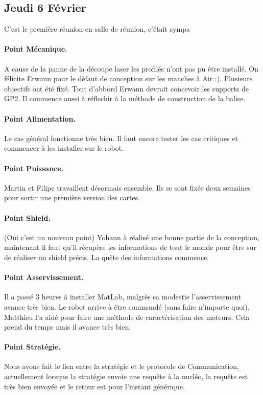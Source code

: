 \documentclass[a4paper,10pt]{report}
\begin{document}
\begin{spacing}{1.5}
\newpage
\section*{Jeudi 6 Février}
C'est le première réunion en salle de réunion, c'était sympa
\paragraph{Point Mécanique.}
A cause de la panne de la découpe laser les profilés n'ont pas pu être installé.
On félicite Erwann pour le défaut de conception sur les manches à Air :).
Plusieurs objectifs ont été fixé. Tout d'abbord Erwann devrait concevoir les
supports de GP2. Il commence aussi à réflechir à la méthode de construction de
la balise.
\paragraph{Point Alimentation.} Le cas général fonctionne très bien. Il faut
encore tester les cas critiques et commencer à les installer sur le robot.
\paragraph{Point Puissance.} Martin et Filipe travaillent désormais ensemble.
Ils se sont fixés deux semaines pour sortir une première version des cartes.
\paragraph{Point Shield.} (Oui c'est un nouveau point) Yohann à réalisé une
bonne partie de la conception, maintenant il faut qu'il récupère les
informations de tout le monde pour être sur de réaliser un shield précis. La
quête des informations commence.
\paragraph{Point Asservissement.} Il a passé 3 heures à installer MatLab,
malgrès sa modestie l'asservissement avance très bien. Le robot arrive à être
commandé (sans faire n'importe quoi), Matthieu l'a aidé pour faire une méthode
de caractérisation des moteurs. Cela prend du temps mais il avance très bien.
\paragraph{Point Stratégie.} Nous avons fait le lien entre la stratégie et le
protocole de Communication, actuellement lorsque la stratégie envoie une requête
à la nucléo, la requête est très bien envoyée et le retour est pour l'instant générique.

\end{spacing}
\end{document}
